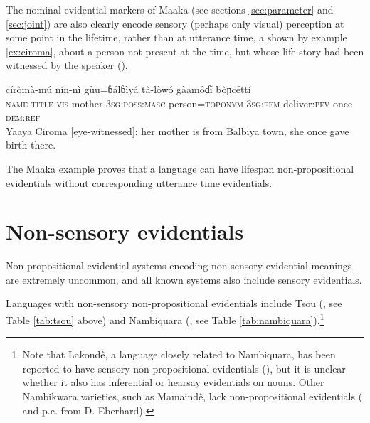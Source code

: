 \documentclass[oneside,a4paper,11pt]{article}
\newcommand{\ipa}[1]{{\phon \mbox{#1}}} %
\begin{document}
The nominal evidential markers of Maaka (see sections \ref{sec:parameter} and \ref{sec:joint}) are also clearly encode sensory (perhaps only visual) perception at some point in the lifetime, rather than at utterance time, a shown by example \ref{ex:ciroma}, about a person not present at the time, but whose life-story had been witnessed by the speaker (\citealt[196]{storch14maaka}).

\begin{exe}
\ex \label{ex:ciroma}
\gll \ipa{yáayà} \ipa{círòmà-mú} \ipa{nín-nì} \ipa{gùu=ɓálɓìyá} \ipa{tà-lòwó} \ipa{gàamôɗí} \ipa{bòɲcéttí} \\
\textsc{name} \textsc{title-vis} mother-\textsc{3sg:poss:masc} person=\textsc{toponym} \textsc{3sg:fem}-deliver:\textsc{pfv} once \textsc{dem:ref} \\
\glt Yaaya Ciroma [eye-witnessed]: her mother is from Balbiya town, she once gave birth there.
\end{exe}

 The Maaka example proves that a language can have lifespan non-propositional evidentials without corresponding utterance time evidentials.
  
\section{Non-sensory evidentials} \label{sec:nonsens}
Non-propositional evidential systems encoding non-sensory evidential meanings are extremely uncommon, and all known systems also include sensory evidentials.

Languages with non-sensory non-propositional evidentials include Tsou (\citealt{yang00tsou.case}, see Table \ref{tab:tsou} above) and Nambiquara (\citealt{lowe99nambiquara}, see Table \ref{tab:nambiquara}).\footnote{Note that Lakondê, a language closely related to Nambiquara, has been reported to have sensory non-propositional evidentials (\citealt[248-9]{wetzels06lakonde}), but it is unclear whether it also has inferential or hearsay evidentials on nouns. Other Nambikwara varieties, such as Mamaindê, lack non-propositional evidentials (\citealt{eberhard09nambikwara} and p.c. from D. Eberhard).}  
\end{document}
